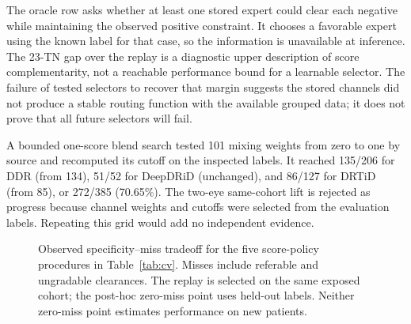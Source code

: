 \documentclass{ieeeaccess}
\begin{document}
The oracle row asks whether at least one stored expert could clear each negative while maintaining the observed positive constraint. It chooses a favorable expert using the known label for that case, so the information is unavailable at inference. The 23-TN gap over the replay is a diagnostic upper description of score complementarity, not a reachable performance bound for a learnable selector. The failure of tested selectors to recover that margin suggests the stored channels did not produce a stable routing function with the available grouped data; it does not prove that all future selectors will fail.

A bounded one-score blend search tested 101 mixing weights from zero to one by source and recomputed its cutoff on the inspected labels. It reached 135/206 for DDR (from 134), 51/52 for DeepDRiD (unchanged), and 86/127 for DRTiD (from 85), or 272/385 (70.65\%). The two-eye same-cohort lift is rejected as progress because channel weights and cutoffs were selected from the evaluation labels. Repeating this grid would add no independent evidence.

\begin{figure}[t]
\centering
{}
\caption{Observed specificity--miss tradeoff for the five score-policy procedures in Table~\ref{tab:cv}. Misses include referable and ungradable clearances. The replay is selected on the same exposed cohort; the post-hoc zero-miss point uses held-out labels. Neither zero-miss point estimates performance on new patients.}
\label{fig:procedure}
\end{figure}
\end{document}
